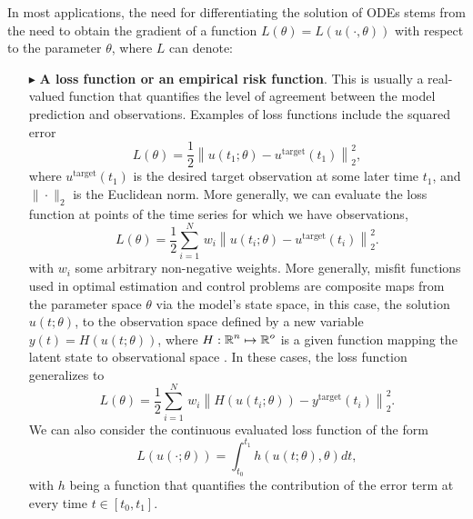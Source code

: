 In most applications, the need for differentiating the solution of ODEs stems from the need to obtain the gradient of a function $L(\theta) = L(u(\cdot, \theta))$ with respect to the parameter $\theta$, where $L$ can denote:
\begin{itemize}
    \item[$ \blacktriangleright$] \textbf{A loss function or an empirical risk function}. This is usually a real-valued function that quantifies the level of agreement between the model prediction and observations. Examples of loss functions include the squared error
    \begin{equation}
         L(\theta) = \frac{1}{2} \left \| u(t_1; \theta) - u^{\text{target}}(t_1) \right \|_2^2,
         \label{eq:quadratic-loss-function}
    \end{equation}
    where $u^{\text{target}}(t_1)$ is the desired target observation at some later time $t_1$, and $\| \cdot \|_2$ is the Euclidean norm.
    More generally, we can evaluate the loss function at points of the time series for which we have observations, 
    \begin{equation}
        L(\theta) 
        = 
        \frac{1}{2} \sum_{i=1}^N 
        \, w_i 
        \left \| u(t_i; \theta) - u^{\text{target}}(t_i) \right \|_2^2.
        \label{eq:quadratic-loss-point}
    \end{equation}
    with $w_i$ some arbitrary non-negative weights.
    More generally, misfit functions used in optimal estimation and control problems are composite maps from the parameter space $\theta$ via the model's state space, in this case, the solution $u(t; \theta)$, to the observation space defined by a new variable $y(t) = H(u(t; \theta))$, where $H: \operatorname{\mathbb{R}}^n \mapsto \operatorname{\mathbb{R}}^o$ is a given function mapping the latent state to observational space \cite{1975-Bryson-Ho-optimal-control}. 
    In these cases, the loss function generalizes to 
    \begin{equation}
        L(\theta) 
        =
        \frac{1}{2} 
        \sum_{i=1}^N
        \, w_i 
        \left \| H(u(t_i; \theta)) - y^{\text{target}}(t_i) \right \|_2^2.
        \label{eq:loss-state-observation}
    \end{equation}
    We can also consider the continuous evaluated loss function of the form
    \begin{equation}
         L(u(\cdot; \theta)) = \int_{t_0}^{t_1} h( u(t;\theta), \theta)  dt, 
         \label{eq:integrated-loss-function}
    \end{equation}
    with $h$ being a function that quantifies the contribution of the error term at every time $t \in [t_0, t_1]$. 

\end{itemize}
